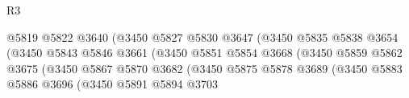 \begin{lexlean}{R3}
\begin{coremodule}
                                                    @5819
                                                    @5822
                                                    @3640
                                                    (@3450
                                                      @5827
                                                      @5830
                                                      @3647
                                                      (@3450
                                                        @5835
                                                        @5838
                                                        @3654
                                                        (@3450
                                                          @5843
                                                          @5846
                                                          @3661
                                                          (@3450
                                                            @5851
                                                            @5854
                                                            @3668
                                                            (@3450
                                                              @5859
                                                              @5862
                                                              @3675
                                                              (@3450
                                                                @5867
                                                                @5870
                                                                @3682
                                                                (@3450
                                                                  @5875
                                                                  @5878
                                                                  @3689
                                                                  (@3450
                                                                    @5883
                                                                    @5886
                                                                    @3696
                                                                    (@3450
                                                                      @5891
                                                                      @5894
                                                                      @3703

\end{coremodule}
\end{lexlean}
